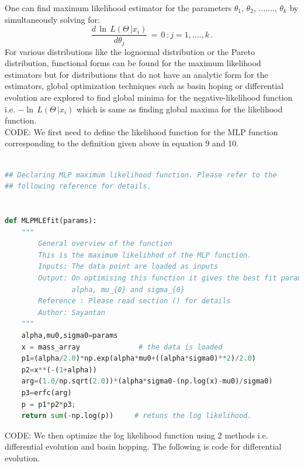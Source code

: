 \documentclass{article}
\begin{document}
One can find maximum likelihood estimator for the parameters $\theta_1,\,\theta_2,\,.......,\,\theta_k$ by simultaneously solving for: 
\begin{equation}
\dfrac{d\,\ln\,L(\Theta\,|x_i)}{d\theta_j}\,=\,0 \, : j = 1,....,k\,.
\end{equation}
For various distributions like the lognormal distribution or the Pareto distribution, functional forms can be found for the maximum likelihood estimators but for distributions that do not have an analytic form for the estimators, global optimization techniques such as basin hoping or differential evolution are explored to find global minima for the negative-likelihood function i.e. $ - \ln\,L(\Theta\,|x_i) $ which is same as finding global maxima for the likelihood function. \\
CODE: We first need to define the likelihood function for the MLP function corresponding to the definition given above in equation 9 and 10.
\begin{lstlisting}[language=Python, caption=Python example]

## Declaring MLP maximum likelihood function. Please refer to the
## following reference for details.


def MLPMLEfit(params):
    """
        General overview of the function
        This is the maximum likelihhod of the MLP function. 
        Inputs: The data point are loaded as inputs
        Output: On optimising this function it gives the best fit paramters
                alpha, mu_{0} and sigma_{0}
        Reference : Please read section () for details
        Author: Sayantan
    """
    alpha,mu0,sigma0=params
    x = mass_array              # the data is loaded
    p1=(alpha/2.0)*np.exp(alpha*mu0+((alpha*sigma0)**2)/2.0)
    p2=x**(-(1+alpha))
    arg=(1.0/np.sqrt(2.0))*(alpha*sigma0-(np.log(x)-mu0)/sigma0)
    p3=erfc(arg)
    p = p1*p2*p3;
    return sum(-np.log(p))     # retuns the log likelihood. 
\end{lstlisting}

CODE: We then optimize the log likelihood function using 2 methods i.e. differential evolution and basin hopping. The following is code for differential evolution.
\end{document}
